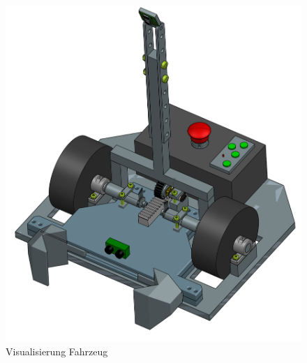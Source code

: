 \begin{figure}[H] %
    \centering
        \includegraphics[width=0.5\linewidth]{Skizze_Fahrzeug.png}
        \caption[Visualisierung Fahrzeug]
        {Visualisierung Fahrzeug}
        
        \label{img:Visualisierung Fahrzeug}
    \end{figure} 
